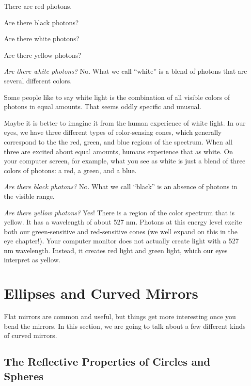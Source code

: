 \begin{Exercise}[title={Photons and Color}, label=photon_color]

  There are red photons.

  Are there black photons?

  Are there white photons?

  Are there yellow photons?
  
\end{Exercise}
\begin{Answer}
  
\textit{Are there white photons?}  No. What we call ``white'' is a
blend of photons that are several different colors.

Some people like to say white light is the combination of all visible
colors of photons in equal amounts. That seems oddly specific and unusual.

Maybe it is better to imagine it from the human experience of white
light. In our eyes, we have three different types of color-sensing
cones, which generally correspond to the the red, green, and
blue regions of the spectrum. When all three are excited about equal
amounts, humans experience that as white. On your computer screen,
for example, what you see as white is just a blend of three colors of
photons: a red, a green, and a blue.

\textit{Are there black photons?}  No. What we call ``black'' is an
absence of photons in the visible range.

\textit{Are there yellow photons?} Yes! There is a region of the color
spectrum that is yellow. It has a wavelength of about 527 nm. Photons
at this energy level excite both our green-sensitive and red-sensitive
cones (we well expand on this in the eye chapter!).
Your computer monitor does not actually create light with a 527 nm
wavelength. Instead, it creates red light and green light, which our
eyes interpret as yellow.

\end{Answer}

\section{Ellipses and Curved Mirrors}

Flat mirrors are common and useful, but things get more interesting
once you bend the mirrors. In this section, we are going to talk about
a few different kinds of curved mirrors.

\subsection{The Reflective Properties of Circles and Spheres}

